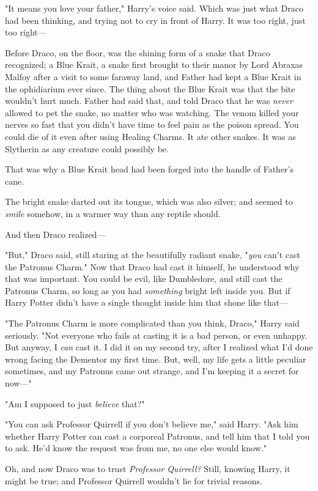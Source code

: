 "It means you love your father," Harry's voice said. Which was just what Draco
had been thinking, and trying not to cry in front of Harry. It was too right,
just too right---

Before Draco, on the floor, was the shining form of a snake that Draco
recognized; a Blue Krait, a snake first brought to their manor by Lord Abraxas
Malfoy after a visit to some faraway land, and Father had kept a Blue Krait in
the ophidiarium ever since. The thing about the Blue Krait was that the bite
wouldn't hurt much. Father had said that, and told Draco that he was
\emph{never} allowed to pet the snake, no matter who was watching. The venom
killed your nerves so fast that you didn't have time to feel pain as the poison
spread. You could die of it even after using Healing Charms. It ate other
snakes. It was as Slytherin as any creature could possibly be.

That was why a Blue Krait head had been forged into the handle of Father's cane.

The bright snake darted out its tongue, which was also silver; and seemed to
\emph{smile} somehow, in a warmer way than any reptile should.

And then Draco realized---

"But," Draco said, still staring at the beautifully radiant snake, "\emph{you}
can't cast the Patronus Charm." Now that Draco had cast it himself, he
understood why that was important. You could be evil, like Dumbledore, and
still cast the Patronus Charm, so long as you had \emph{something} bright left
inside you. But if Harry Potter didn't have a single thought inside him that
shone like that---

"The Patronus Charm is more complicated than you think, Draco," Harry said
seriously. "Not everyone who fails at casting it is a bad person, or even
unhappy. But anyway, I \emph{can} cast it. I did it on my second try, after I
realized what I'd done wrong facing the Dementor my first time. But, well, my
life gets a little peculiar sometimes, and my Patronus came out strange, and
I'm keeping it a secret for now\mbox{---}"

"Am I supposed to just \emph{believe} that?"

"You can ask Professor Quirrell if you don't believe me," said Harry. "Ask him
whether Harry Potter can cast a corporeal Patronus, and tell him that I told
you to ask. He'd know the request was from me, no one else would know."

Oh, and now Draco was to trust \emph{Professor Quirrell?} Still, knowing Harry,
it might be true; and Professor Quirrell wouldn't lie for trivial reasons.

